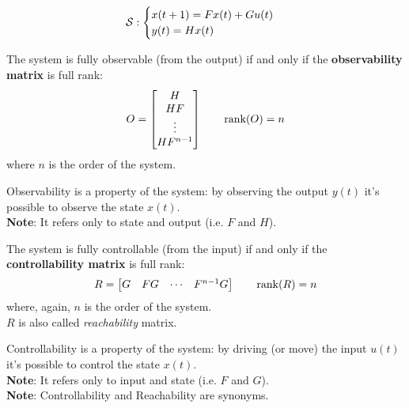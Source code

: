 \[
    \mathcal{S}: 
    \begin{cases}
        x(t+1) = Fx(t) + Gu(t) \\
        y(t) = Hx(t)
    \end{cases}
\]

\begin{definition}
The system is fully observable (from the output) if and only if the \textbf{observability matrix} is full rank:
\[
    O = \begin{bmatrix}
        H \\
        HF \\
        \vdots \\
        HF^{n-1}
    \end{bmatrix}
    \qquad
    \operatorname*{rank} (O) = n
\]
where $n$ is the order of the system.
\end{definition}

\begin{obs}[Observability]
Observability is a property of the system: by observing the output $y(t)$ it's possible to observe the state $x(t)$.\\
\textbf{Note}: It refers only to state and output (i.e. $F$ and $H$).
\end{obs}

\begin{definition}
The system is fully controllable (from the input) if and only if the \textbf{controllability matrix} is full rank:
\[
    R = \begin{bmatrix}
        G & FG & \cdots & F^{n-1}G
    \end{bmatrix}
    \qquad
    \operatorname*{rank} (R) = n
\]
where, again, $n$ is the order of the system.\\
$R$ is also called \emph{reachability} matrix.
\end{definition}

\begin{obs}[Controllability]
Controllability is a property of the system: by driving (or move) the input $u(t)$ it's possible to control the state $x(t)$.\\
\textbf{Note}: It refers only to input and state (i.e. $F$ and $G$).\\
\textbf{Note}: Controllability and Reachability are synonyms.
\end{obs}

